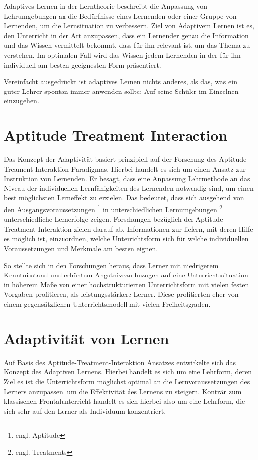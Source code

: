 Adaptives Lernen in der Lerntheorie beschreibt die Anpassung von Lehrumgebungen
an die Bedürfnisse eines Lernenden oder einer Gruppe von Lernenden, um die Lernsituation
zu verbessern. Ziel von Adaptivem Lernen ist es, den Unterricht in der Art anzupassen,
dass ein Lernender genau die Information und das Wissen vermittelt bekommt, dass für ihn relevant ist,
um das Thema zu verstehen. Im optimalen Fall wird das Wissen jedem Lernenden
in der für ihn individuell am besten geeignesten Form präsentiert.

Vereinfacht ausgedrückt ist adaptives Lernen nichts anderes, als das, was ein guter Lehrer
spontan immer anwenden sollte: Auf seine Schüler im Einzelnen einzugehen.

\section{Aptitude Treatment Interaction}
Das Konzept der Adaptivität basiert prinzipiell auf der Forschung des Aptitude-Treament-Interaktion Paradigmas.
Hierbei handelt es sich um einen Ansatz zur Instruktion von Lernenden.
Er besagt, dass eine Anpassung Lehrmethode an das Niveau der individuellen Lernfähigkeiten
des Lernenden notwendig sind, um einen best möglichsten Lerneffekt zu erzielen.
Das bedeutet, dass sich ausgehend von den Ausgangsvoraussetzungen \footnote{engl. Aptitude}
in unterschiedlichen Lernumgebungen \footnote{engl. Treatments} unterschiedliche Lernerfolge zeigen.
Forschungen bezüglich der Aptitude-Treatment-Interaktion zielen darauf ab, Informationen
zur liefern, mit deren Hilfe es möglich ist, einzuordnen, welche Unterrichtsform sich
für welche individuellen Voraussetzungen und Merkmale am besten eignen.\cite[S. 203]{krohne2007psychologische}

So stellte sich in den Forschungen heraus, dass Lerner mit niedrigerem Kenntnisstand und erhöhtem Angstniveau bezogen auf
eine Unterrichtssituation in höherem Maße von einer hochstrukturierten Unterrichtsform mit vielen festen Vorgaben profitieren,
als leistungsstärkere Lerner. Diese profitierten eher von einem gegensätzlichen Unterrichtsmodell mit vielen Freiheitsgraden.
\cite[S.65]{hasselhornlernverlaufsdiagnostik}

\section{Adaptivität von Lernen}
Auf Basis des Aptitude-Treatment-Interaktion Ansatzes entwickelte sich das Konzept des Adaptiven Lernens.
Hierbei handelt es sich um eine Lehrform, deren Ziel es ist die Unterrichtsform möglichst optimal an die Lernvoraussetzungen
des Lerners anzupassen, um die Effektivität des Lernens zu steigern. Konträr zum klassischen Frontalunterricht handelt
es sich hierbei also um eine Lehrform, die sich sehr auf den Lerner als Individuum konzentriert.

